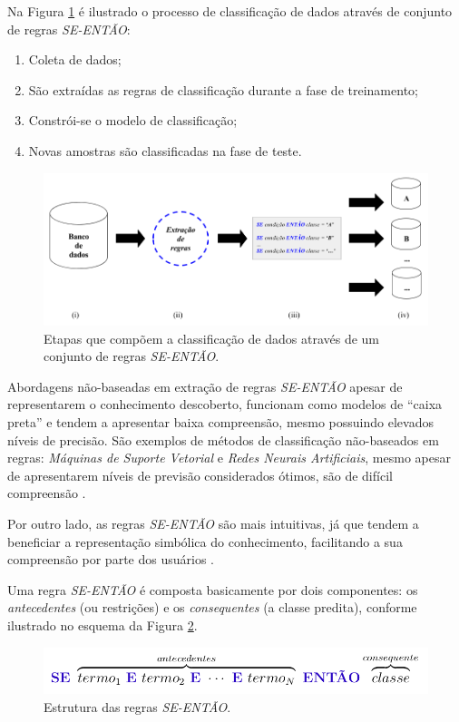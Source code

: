 \documentclass[
	12pt,				%
	openany,			%
	oneside,	
	a4paper,			%
	brazil,				%
	]{unimontes-ppgmsc-abntex2}
\begin{document}
Na Figura \ref{fig:modeloPSO} é ilustrado o processo de classificação de dados através de conjunto de regras {\em SE-ENTÃO}: 

\begin{enumerate}[label={(\roman*)}]
\item Coleta de dados;
\item São extraídas as regras de classificação durante a fase de treinamento;
\item Constrói-se o modelo de classificação;
\item Novas amostras são classificadas na fase de teste.
\end{enumerate}

\begin{figure}[ht]
\centering
\includegraphics[scale=.4]{img/modelo}
\caption{Etapas que compõem a classificação de dados através de um conjunto de regras {\em SE-ENTÃO}.}
\label{fig:modeloPSO}
\end{figure}

Abordagens não-baseadas em extração de regras {\em SE-ENTÃO} apesar de representarem o conhecimento descoberto, funcionam como modelos de ``caixa preta'' e tendem a apresentar baixa compreensão, mesmo possuindo elevados níveis de precisão. São exemplos de métodos de classificação não-baseados em regras: {\em Máquinas de Suporte Vetorial} e {\em Redes Neurais Artificiais}, mesmo apesar de apresentarem níveis de previsão considerados ótimos, são de  difícil compreensão \cite{Hassani_2013}. 

Por outro lado, as regras {\em SE-ENTÃO} são mais intuitivas, já que tendem a beneficiar a representação simbólica do conhecimento, facilitando a sua compreensão por parte dos usuários \cite{Wang_2007}.

Uma regra {\em SE-ENTÃO} é composta basicamente por dois componentes: os {\em antecedentes} (ou restrições) e os {\em consequentes} (a classe predita), conforme ilustrado no esquema da Figura \ref{fig:se-entao}.

\begin{figure}[ht]
\centering
\includegraphics[scale=.5]{img/se-entao}
\caption{Estrutura das regras {\em SE-ENTÃO}.}
\label{fig:se-entao}
\end{figure}
\end{document}
